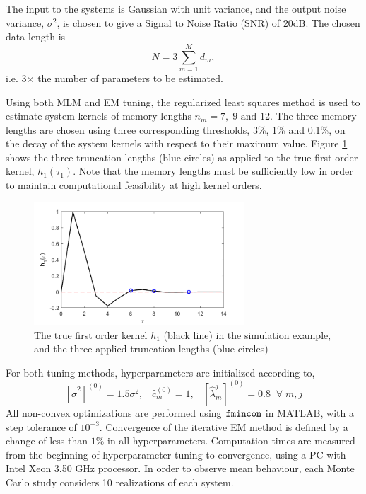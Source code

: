 The input to the systems is Gaussian with unit variance, and the output noise variance, $\sigma^2$, is chosen to give a Signal to Noise Ratio (SNR) of 20dB. The chosen data length is
$$N = 3 \sum_{m=1}^{M}d_m,$$
i.e. 3$\times$ the number of parameters to be estimated.

Using both MLM and EM tuning, the regularized least squares method is used to estimate system kernels of memory lengths $n_m = 7, \; 9 \text{ and } 12$. The three memory lengths are chosen using three corresponding thresholds, 3\%, 1\% and 0.1\%, on the decay of the system kernels with respect to their maximum value. Figure \ref{fig:LinearKernel_EM} shows the three truncation lengths (blue circles) as applied to the true first order kernel, $h_1(\tau_1)$. Note that the memory lengths must be sufficiently low in order to maintain computational feasibility at high kernel orders. 

\begin{figure}[h]
\centering
\includegraphics[width = 0.7\textwidth]{Chapter4_EM/LinearKernel_EM.pdf}
\caption{The true first order kernel $h_1$ (black line) in the simulation example, and the three applied truncation lengths (blue circles)}
\label{fig:LinearKernel_EM}
\end{figure}

For both tuning methods, hyperparameters are initialized according to,
$$ [\hat{\sigma}^2]^{(0)} = 1.5\sigma^2, \; \; \; \hat{c}_m^{(0)} = 1, \; \; \; [\hat{\lambda}_m^j]^{(0)} = 0.8 \; \; \forall \; m,j$$
All non-convex optimizations are performed using $\text{\tt{fmincon}}$ in MATLAB, with a step tolerance of $10^{-3}$. Convergence of the iterative EM method is defined by a change of less than $1\%$ in all hyperparameters. Computation times are measured from the beginning of hyperparameter tuning to convergence, using a PC with Intel Xeon 3.50 GHz processor. In order to observe mean behaviour, each Monte Carlo study considers 10 realizations of each system.

